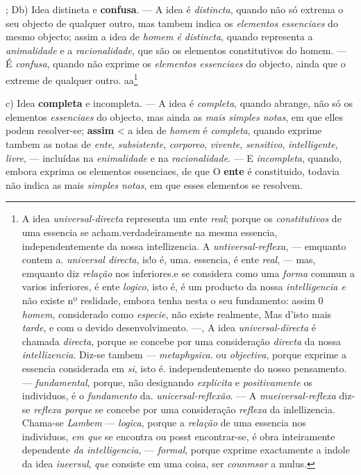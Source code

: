 ; Db) Idea distineta e \textbf{confusa}. --- A idea é \emph{distincta}, quando não só extrema o seu objecto de qualquer outro, mas tambem indica os \emph{elementos essenciaes} do mesmo objecto; assim a idea de \emph{homem é distincta}, quando representa a \emph{animalidade} e a \emph{racionalidade}, que são os elementos constitutivos do homem. --- É \emph{confusa}, quando não exprime os \emph{elementos essenciaes} do objecto, ainda que o extreme de qualquer outro. aa\footnote{A idea \emph{universal-directa} representa um ente \emph{real}; porque os \emph{constitutivos} de uma essencia se acham.verdadeiramente na mesma essencia, independentemente da nossa intellizencia. A \emph{untiversal-reflexa}, --- emquanto contem a. \emph{universal directa}, is!o é, uma. essencia, é ente \emph{real}, --- mas, emquanto diz \emph{relação} nos inferiores.e se considera como uma \emph{forma} commun a varios inferiores, é ente \emph{logico}, isto é, é um producto da nossa \emph{intelligencia e} não existe nº reslidade, embora tenha nesta o seu fundamento: assim 0 \emph{homem}, considerado como \emph{especie}, não existe realmente, Mas d'isto mais \emph{tarde}, e com o devido desenvolvimento. ---, A idea \emph{universal-directa} é chamada \emph{directa}, porque se concebe por uma consideração \emph{directa} da nossa \emph{intellizencia}. Diz-se tambem --- \emph{metaphysica}. ou \emph{objectiva}, porque exprime a essencia considerada em \emph{si}, isto é. independentemente do nosso pensamento. --- \emph{fundamental}, porque, não designando \emph{explicita} e \emph{positivamente} os individuos, é o \emph{fundamento} da. \emph{unicersal-reflexão}. --- A \emph{mueiversal-reflexa} diz-se \emph{reflexa porque} se concebe por uma consideração \emph{reflexa} da inlellizencia. Chama-se \emph{Lambem} --- \emph{logica}, porque a \emph{relação} de uma essencia nos individuos, \emph{em que} se encontra ou posst encontrar-se, é obra inteiramente dependente \emph{da intelligencia}, --- \emph{formal}, porque exprime exactamente a indole da idea \emph{iueersul}, \emph{que} consiste em uma coisa, ser \emph{counmsar} a mulus.}

c) Idea \textbf{completa} e incompleta. --- A idea é \emph{completa}, quando abrange, não só os elementos \emph{essenciaes} do objecto, mas ainda as \emph{mais simples notas}, em que elles podem resolver-se; \textbf{assim} \textless{} a idea de \emph{homem} é \emph{completa}, quando exprime tambem as notas de \emph{ente}, \emph{subsistente}, \emph{corporeo}, \emph{vivente}, \emph{sensitivo}, \emph{intelligente}, \emph{livre}, --- incluídas na \emph{enimalidade} e na \emph{racionalidade}. --- E \emph{incompleta}, quando, embora exprima os elementos essenciaes, de que O \textbf{ente} é constituido, todavia não indica as mais \emph{simples notas}, em que esses elementos se resolvem.

